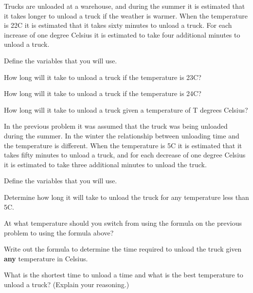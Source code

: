\begin{problem}
\item Trucks are unloaded at a warehouse, and during the summer it is
  estimated that it takes longer to unload a truck if the weather is
  warmer. When the temperature is 22C it is estimated that it takes
  sixty minutes to unload a truck. For each increase of one degree
  Celsius it is estimated to take four additional minutes to unload a
  truck.
  \begin{subproblem}
  \item Define the variables that you will use.
    \vspace{2em}
  \item How long will it take to unload a truck if the temperature
    is 23C?
    \vspace{2em}
  \item How long will it take to unload a truck if the temperature
    is 24C?
    \vspace{2em}
  \item How long will it take to unload a truck given a temperature
    of T degrees Celsius?
    \vfill
  \end{subproblem}

  \clearpage

\item In the previous problem it was assumed that the truck was being
  unloaded during the summer. In the winter the relationship between
  unloading time and the temperature is different. When the
  temperature is 5C it is estimated that it takes fifty minutes to
  unload a truck, and for each decrease of one degree Celsius it is
  estimated to take three additional minutes to unload the truck.
  \begin{subproblem}
  \item Define the variables that you will use.
    \vspace{2em}
  \item Determine how long it will take to unload the truck for any
    temperature less than 5C.
    \vfill
  \item At what temperature should you switch from using the
    formula on the previous problem to using the formula above?
    \vfill
    \vfill
  \item Write out the formula to determine the time required to
    unload the truck given \textbf{any} temperature in Celsius.
    \vspace{3em}
  \item What is the shortest time to unload a time and what is the
    best temperature to unload a truck?  (Explain your reasoning.)
    \vspace{2em}
  \end{subproblem}

\end{problem}

